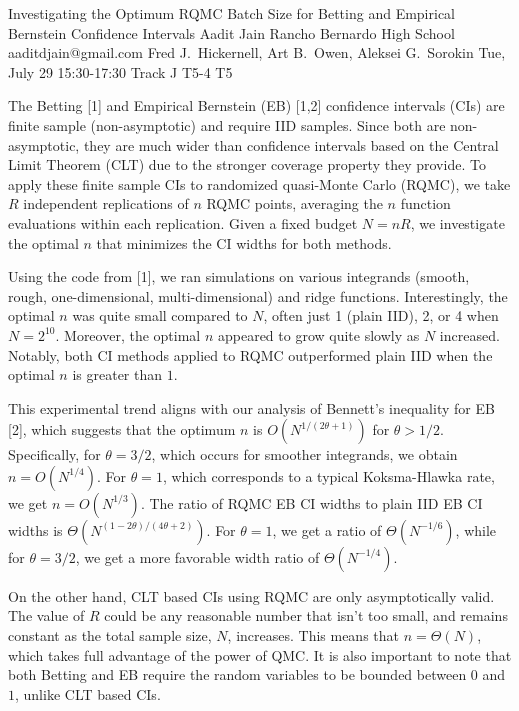 \begin{talk}
  {Investigating the Optimum RQMC Batch Size for Betting and Empirical Bernstein Confidence Intervals}%
  {Aadit Jain}%
  {Rancho Bernardo High School}%
  {aaditdjain@gmail.com}%
  {Fred J.\ Hickernell, Art B.\ Owen, Aleksei G.\ Sorokin}%
  {}%
  {Tue, July 29 15:30-17:30 Track J}%
  {T5-4}%
  {T5}%
  
				
			

The Betting [1] and Empirical Bernstein (EB) [1,2] confidence intervals (CIs) are finite sample (non-asymptotic) and require IID samples. Since both are non-asymptotic, they are much wider than confidence intervals based on the Central Limit Theorem (CLT) due to the stronger coverage property they provide. To apply these finite sample CIs to randomized quasi-Monte Carlo (RQMC), we take $R$ independent replications of $n$ RQMC points, averaging the $n$ function evaluations within each replication. Given a fixed budget $N = nR$, we investigate the optimal $n$ that minimizes the CI widths for both methods.  

Using the code from [1], we ran simulations on various integrands (smooth, rough, one-dimensional, multi-dimensional) and ridge functions. Interestingly, the optimal $n$ was quite small compared to $N$, often just 1 (plain IID), 2, or 4 when $N = 2^{10}$. Moreover, the optimal $n$ appeared to grow quite slowly as $N$ increased. Notably, both CI methods applied to RQMC outperformed plain IID when the optimal $n$ is greater than $1$.  

This experimental trend aligns with our analysis of Bennett’s inequality for EB [2], which suggests that the optimum $n$ is $O(N^{1/(2\theta + 1)})$ for $\theta > 1/2$. 
Specifically, for $\theta = 3/2$, which occurs for smoother integrands, we obtain $n = O(N^{1/4})$. For $\theta = 1$, which corresponds to a typical Koksma-Hlawka rate, we get $n = O(N^{1/3})$. The ratio of RQMC EB CI widths to plain IID EB CI widths is $\Theta( N^{(1-2\theta)/(4\theta+2)})$. For $\theta=1$,
we get a ratio of $\Theta(N^{-1/6})$,
while for $\theta=3/2$,
we get a more favorable width ratio of $\Theta(N^{-1/4})$. 


On the other hand, CLT based CIs using RQMC  are only asymptotically valid. The value of $R$ could be any reasonable number that isn't too small, and remains constant as the total sample size, $N$, increases.  This means that $n = \Theta(N)$, which takes full advantage of the power of QMC.  It is also important to note that both Betting and EB require the random variables to be bounded between $0$ and $1$, unlike CLT based CIs. 



\end{talk}

